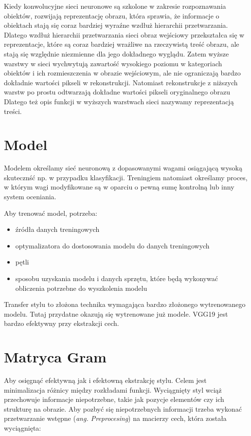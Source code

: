 \documentclass[brudnopis]{xmgr}
\begin{document}
Kiedy konwolucyjne sieci neuronowe są szkolone w zakresie rozpoznawania obiektów, rozwijają reprezentację obrazu, która sprawia, że informacje o obiektach stają się coraz bardziej wyraźne wzdłuż hierarchii przetwarzania. Dlatego wzdłuż hierarchii przetwarzania sieci obraz wejściowy przekształca się w reprezentacje, które są coraz bardziej wrażliwe na rzeczywistą treść obrazu, ale stają się względnie niezmienne dla jego dokładnego wyglądu. Zatem wyższe warstwy w sieci wychwytują zawartość wysokiego poziomu w kategoriach obiektów i ich rozmieszczenia w obrazie wejściowym, ale nie ograniczają bardzo dokładnie wartości pikseli w rekonstrukcji. Natomiast rekonstrukcje z niższych warstw po prostu odtwarzają dokładne wartości pikseli oryginalnego obrazu Dlatego też opis funkcji w wyższych warstwach sieci nazywamy reprezentacją treści.


\section{Model\label{s:dsssl}}
Modelem określamy sieć neuronową z dopasowanymi wagami osiągającą wysoką skutecznść np. w przypadku klasyfikacji. Treningiem natomiast określamy proces, w którym wagi modyfikowane są w oparciu o pewną sumę kontrolną lub inny system oceniania.

Aby trenować model, potrzeba:

\begin{itemize}
\item źródła danych treningowych
\item optymalizatora do dostosowania modelu do danych treningowych 
\item pętli  
\item sposobu uzyskania modelu i danych sprzętu, które będą wykonywać obliczenia potrzebne do wyszkolenia modelu

\end{itemize}

Transfer stylu to złożona technika wymagająca bardzo złożonego wytrenowanego modelu. Tutaj przydatne okazują się wytrenowane już modele. VGG19 jest bardzo efektywny przy ekstrakcji cech.

\section{Matryca Gram\label{s:dsssl}}
Aby osięgnąć efektywną jak i efektowną ekstrakcję stylu. Celem jest minimalizacja różnicy między rozkładami funkcji. Wyciągnięty styl wciąż przechowuje informacje niepotrzebne, takie jak pozycje elementów czy ich strukturę na obrazie. Aby pozbyć się niepotrzebnych informacji trzeba wykonać przetwarzanie wstępne (\textit{ang. Preprocesing}) na macierzy cech, która została wyciągnięta:
\end{document}
